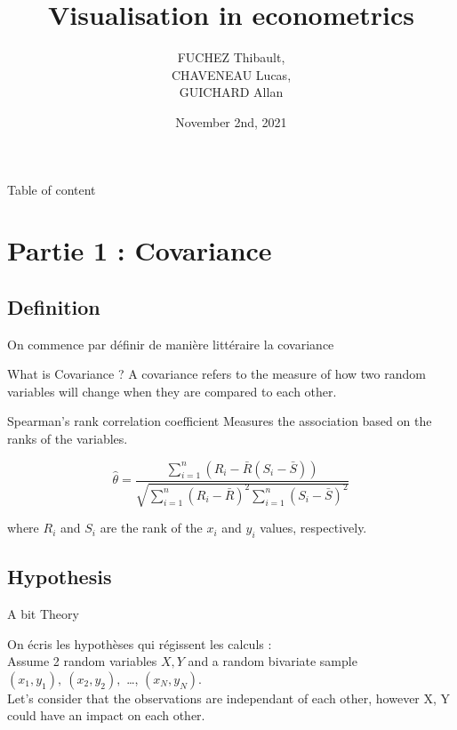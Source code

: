 \documentclass{beamer}
\title{Visualisation in econometrics}
\author{FUCHEZ Thibault, \\
CHAVENEAU Lucas, \\ 
GUICHARD Allan}
\date{November 2nd, 2021}
\begin{document}
\maketitle


\begin{frame}{Table of content}
    \tableofcontents[hideallsubsections]{}
\end{frame}

\section{Partie 1 : Covariance}

\subsection{Definition}

\begin{frame}
On commence par définir de manière littéraire la covariance
    \begin{block}{What is Covariance ?}
        A covariance refers to the measure of how two random variables will change when they are compared to each other.
    \end{block}
    \begin{block}{Spearman's rank correlation coefficient}
        Measures the association based on the ranks of the variables.
    \end{block}
    $$
    \hat{\theta}=\frac{\sum_{i=1}^n(R_i-\bar{R}(S_i-\bar{S}))}{\sqrt{\sum_{i=1}^n(R_i-\bar{R})^2\sum_{i=1}^n(S_i-\bar{S})^2}}
    $$

where $R_i$ and $S_i$ are the rank of the $x_i$ and $y_i$ values, respectively.
\end{frame}

\subsection{Hypothesis}

\begin{frame}{A bit Theory}

On écris les hypothèses qui régissent les calculs :\\
\vspace{10}
Assume 2 random variables $X, Y$ and a random bivariate sample $(x_1, y_1),\ (x_2, y_2),$  \ldots , $(x_N, y_N)$. \\
\vspace{10}
Let's consider that the observations are independant of each other, however X, Y could have an impact on each other. 
\end{frame}
\end{document}
